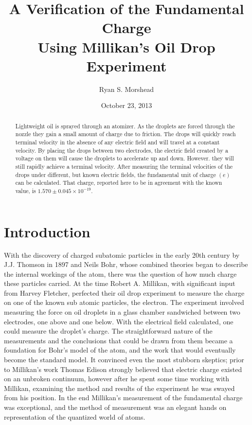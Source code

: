 \documentclass[prb,preprint]{revtex4-1}
\begin{document}
\title{A Verification of the Fundamental Charge \\ Using Millikan's Oil Drop Experiment}

\author{Ryan S. Morshead}


\date{October 23, 2013}

\begin{abstract}
Lightweight oil is sprayed through an atomizer. As the droplets are forced through the nozzle they gain a small amount of charge due to friction. The drops will quickly reach terminal velocity in the absence of any electric field and will travel at a constant velocity. By placing the drops between two electrodes, the electric field created by a voltage on them will cause the droplets to accelerate up and down. However. they will still rapidly achieve a terminal velocity. After measuring the terminal velocities of the drops under different, but known electric fields, the fundamental unit of charge $(e)$ can be calculated. That charge, reported here to be in agreement with the known value, is $1.570\pm0.045\times10^{-19}$.
\end{abstract}


\maketitle


\section{Introduction}

With the discovery of charged subatomic particles in the early 20th century by J.J. Thomson in 1897 and Neils Bohr, whose combined theories began to describe the internal workings of the atom, there was the question of how much charge these particles carried. At the time Robert A. Millikan, with significant input from Harvey Fletcher, perfected their oil drop experiment to measure the charge on one of the known sub atomic particles, the electron. The experiment involved measuring the force on oil droplets in a glass chamber sandwiched between two electrodes, one above and one below. With the electrical field calculated, one could measure the droplet's charge. The straightforward nature of the measurements and the conclusions that could be drawn from them became a foundation for Bohr's model of the atom, and the work that would eventually become the standard model. It convinced even the most stubborn skeptics; prior to Millikan's work Thomas Edison strongly believed that electric charge existed on an unbroken continuum, however after he spent some time working with Millikan, examining the method and results of the experiment he was swayed from his position. In the end Millikan's measurement of the fundamental charge was exceptional, and the method of measurement was an elegant hands on representation of the quantized world of atoms. 
\end{document}
